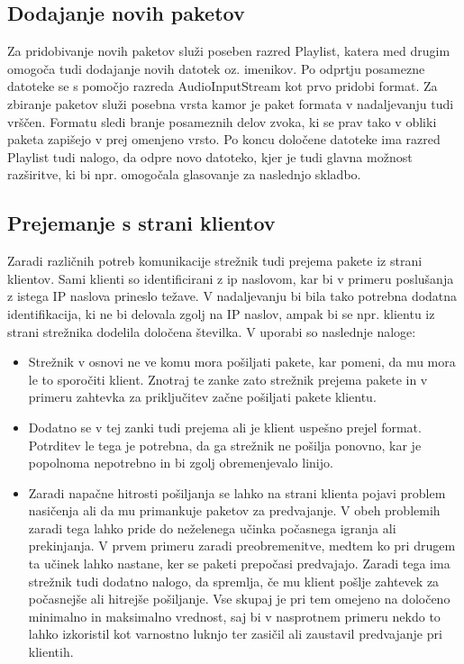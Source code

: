 \documentclass[journal]{IEEEtran}
\begin{document}
\subsection{Dodajanje novih paketov}

Za pridobivanje novih paketov služi poseben razred Playlist, katera med drugim omogoča tudi dodajanje novih datotek oz. imenikov. Po odprtju posamezne datoteke se s pomočjo razreda AudioInputStream kot prvo pridobi format. Za zbiranje paketov služi posebna vrsta kamor je paket formata v nadaljevanju tudi vrščen. Formatu sledi branje posameznih delov zvoka, ki se prav tako v obliki paketa zapišejo v prej omenjeno vrsto. Po koncu določene datoteke ima razred Playlist tudi nalogo, da odpre novo datoteko, kjer je tudi glavna možnost razširitve, ki bi npr. omogočala glasovanje za naslednjo skladbo.

\subsection{Prejemanje s strani klientov}

Zaradi različnih potreb komunikacije strežnik tudi prejema pakete iz strani klientov. Sami klienti so identificirani z ip naslovom, kar bi v primeru poslušanja z istega IP naslova prineslo težave. V nadaljevanju bi bila tako potrebna dodatna identifikacija, ki ne bi delovala zgolj na IP naslov, ampak bi se npr. klientu iz strani strežnika dodelila določena številka. V uporabi so naslednje naloge:
\begin{itemize}
	\item Strežnik v osnovi ne ve komu mora pošiljati pakete, kar pomeni, da mu mora le to sporočiti klient. Znotraj te zanke zato strežnik prejema pakete in v primeru zahtevka za priključitev začne pošiljati pakete klientu.
	\item Dodatno se v tej zanki tudi prejema ali je klient uspešno prejel format. Potrditev le tega je potrebna, da ga strežnik ne pošilja ponovno, kar je popolnoma nepotrebno in bi zgolj obremenjevalo linijo.
	\item Zaradi napačne hitrosti pošiljanja se lahko na strani klienta pojavi problem nasičenja ali da mu primankuje paketov za predvajanje. V obeh problemih zaradi tega lahko pride do neželenega učinka počasnega igranja ali prekinjanja. V prvem primeru zaradi preobremenitve, medtem ko pri drugem ta učinek lahko nastane, ker se paketi prepočasi predvajajo. Zaradi tega ima strežnik tudi dodatno nalogo, da spremlja, če mu klient pošlje zahtevek za počasnejše ali hitrejše pošiljanje. Vse skupaj je pri tem omejeno na določeno minimalno in maksimalno vrednost, saj bi v nasprotnem primeru nekdo to lahko izkoristil kot varnostno luknjo ter zasičil ali zaustavil predvajanje pri klientih.
\end{itemize}
\end{document}
